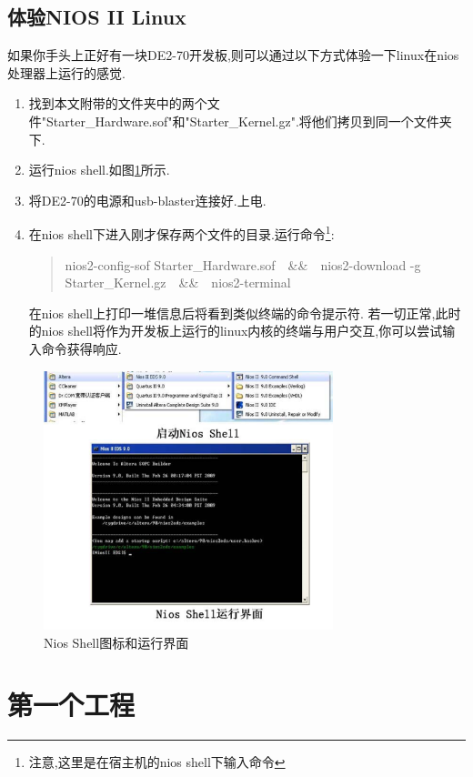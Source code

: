 \documentclass[12pt,a4paper,titlepage]{article}
\begin{document}
\subsection{体验NIOS II Linux}
如果你手头上正好有一块DE2-70开发板,则可以通过以下方式体验一下linux在nios处理器上运行的感觉.
\begin{enumerate}
\item 找到本文附带的文件夹中的两个文件"Starter\_Hardware.sof"和"Starter\_Kernel.gz".将他们拷贝到同一个文件夹下.
\item 运行nios shell.如图\ref{ns}所示.
\item 将DE2-70的电源和usb-blaster连接好.上电.
\item 在nios shell下进入刚才保存两个文件的目录.{运行命令}\footnote{注意,这里是在宿主机的nios shell下输入命令}:
\begin{verse}
nios2-config-sof Starter\_Hardware.sof\ {}\ {}\&\&\ {}\ {}nios2-download -g Starter\_Kernel.gz\ {}\ {}\&\&\ {}\ {}nios2-terminal
\end{verse}
在nios shell上打印一堆信息后将看到类似终端的命令提示符.
若一切正常,此时的nios shell将作为开发板上运行的linux内核的终端与用户交互,你可以尝试输入命令获得响应.
\end{enumerate}
\begin{figure}[!htbp]
\centering
\includegraphics[width=0.75\textwidth,scale=0.75]{pic/f_shell_and_icon.eps}
\caption{Nios Shell图标和运行界面\label{ns}}
\end{figure}
\newpage{}
\section{第一个工程}
\end{document}
